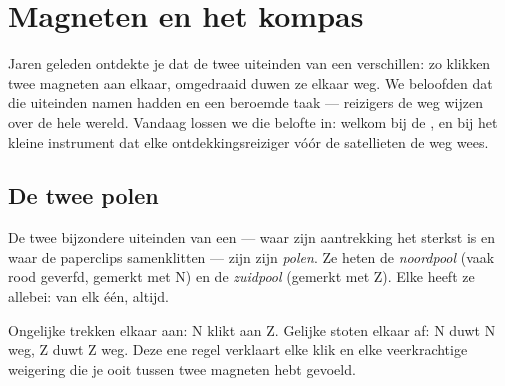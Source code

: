 \chapter{Magneten en het kompas}\label{ch:g4:magnets-and-compass}

Jaren geleden ontdekte je dat de twee uiteinden van een 
verschillen: zo klikken twee magneten aan elkaar, omgedraaid duwen ze
elkaar weg. We beloofden dat die uiteinden namen hadden en een beroemde
taak --- reizigers de weg wijzen over de hele wereld. Vandaag lossen we
die belofte in: welkom bij de , en bij het kleine instrument dat
elke ontdekkingsreiziger vóór de satellieten de weg wees.

\section{De twee polen}

\begin{definition}[Polen]\label{def:g4:magnets-and-compass:poles}
De twee bijzondere uiteinden van een  --- waar zijn aantrekking
het sterkst is en waar de paperclips samenklitten --- zijn zijn
\emph{polen}. Ze heten de
\emph{noordpool} (vaak rood geverfd, gemerkt met N)
en de \emph{zuidpool} (gemerkt met Z). Elke
 heeft ze allebei: van elk één, altijd.
\end{definition}

\begin{proposition}[De poolregel]\label{prop:g4:magnets-and-compass:rule}
Ongelijke  trekken elkaar aan: N klikt aan Z. Gelijke
 stoten elkaar af: N duwt N weg, Z duwt Z weg. Deze ene regel
verklaart elke klik en elke veerkrachtige weigering die je ooit tussen
twee magneten hebt gevoeld.
\end{proposition}

